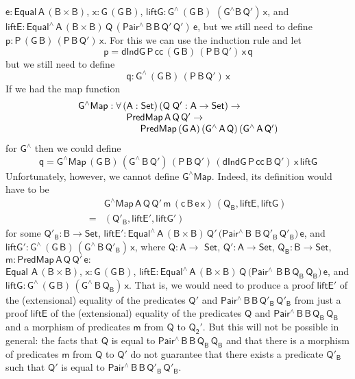\documentclass[sigplan,10pt,anonymous,review]{acmart}
\begin{document}
$\mathsf{e : Equal\,A\,(B \times B)}$, $\mathsf{x : G\,(G\,B)}$,
$\mathsf{liftG : G^{\wedge}\,(G\,B)}$ $\mathsf{(G^{\wedge}
  B\,Q')\,x}$, and $\mathsf{liftE : Equal^{\wedge}\,A\,(B \times
  B)\,Q\,(Pair^{\wedge}\,B\,B\,Q'\,Q')\,e}$, but we still need to
define $\mathsf{p : P\,(G\,B)\,(P\,B\,Q')\,x}$.  For this we can use
the induction rule and let
\[\mathsf{p = dIndG\,P\,cc\,(G\,B)\,(P\,B\,Q')\,x\,q}\] but we still
need to define \[\mathsf{q : G^{\wedge}\,(G\,B)\,(P\,B\,Q')\,x}\]  If
we had the map function
\[\begin{array}{l}
\mathsf{G^\wedge Map : \forall\, (A : Set)\,
  (Q\;Q' : A \to Set) \to}\\
\hspace*{0.7in}\mathsf{PredMap\,A\,Q\,Q' \to}\\
\hspace*{0.9in}\mathsf{PredMap\,(G\,A)\,(G^{\wedge}\,A\,Q)\,(G^{\wedge}\,A\,Q')} 
\end{array}\]
for $\mathsf{G^{\wedge}}$
then we could define
\[\mathsf{q = G^\wedge Map\,(G\,B)\,(G^{\wedge}\,B\,Q')\,(P\,B\,Q')\,
(dIndG\,P\,cc\,B\,Q')\,x\,liftG}\]  Unfortunately, however,
we cannot define $\mathsf{G^\wedge Map}$. Indeed, its definition would
have to be
\[\begin{array}{ll}
 & \!\!\mathsf{G^\wedge Map\,A\,Q\,Q'\,m\,(c\,B\,e\,x)\,(Q_B,
  liftE, liftG)}\\
\quad\quad= & \!\! \mathsf{(Q'_B, liftE', liftG')}
\end{array}\] for some $\mathsf{Q'_B : B
  \to Set}$, $\mathsf{liftE' : Equal^{\wedge}\,A\,(B \times
  B)\,Q'\,(Pair^{\wedge}\,B}$ $\mathsf{B\,Q'_B\,Q'_B)\,e}$, and
$\mathsf{liftG' : G^{\wedge}\,(G\,B)\,(G^{\wedge}\,B\,Q'_B)\,x}$,
where $\mathsf{Q : A \to}$ $\mathsf{Set}$, $\mathsf{Q' : A \to Set}$,
$\mathsf{Q_B : B \to Set}$, $\mathsf{m : PredMap\,A\,Q\,Q'\,e :
}$\\ $\mathsf{Equal}$ $\mathsf{A\,(B \times B)}$, $\mathsf{x :
  G\,(G\,B)}$, $\mathsf{liftE : Equal^{\wedge}\,A\,(B \times
  B)\,Q\,(Pair^{\wedge}}$ $\mathsf{B\,B\,Q_B\,Q_B)\,e}$, and
$\mathsf{liftG : G^{\wedge}\,(G\,B)\,(G^{\wedge}\,B\,Q_B)\,x}$. 
That is, we would need to produce a proof $\mathsf{liftE'}$ of the
(extensional) equality of the predicates $\mathsf{Q'}$ and
$\mathsf{Pair^{\wedge}\,B\,B\,Q'_B\,Q'_B}$ from just a proof
$\mathsf{liftE}$ of the (extensional) equality of the predicates
$\mathsf{Q}$ and $\mathsf{Pair^{\wedge}\,B\,B\,Q_B\,Q_B}$ and a
morphism of predicates $\mathsf{m}$ from $\mathsf{Q}$ to
$\mathsf{Q_2'}$.
But this will not be possible in general: the facts that $\mathsf{Q}$
is equal to $\mathsf{Pair^{\wedge}\,B\,B\,Q_B\,Q_B}$ and that there is
a morphism of predicates $\mathsf{m}$ from $\mathsf{Q}$ to
$\mathsf{Q'}$ do not guarantee that there exists a predicate
$\mathsf{Q'_B}$ such that $\mathsf{Q'}$ is equal to
$\mathsf{Pair^{\wedge}\,B\,B\,Q'_B\,Q'_B}$.
\end{document}
